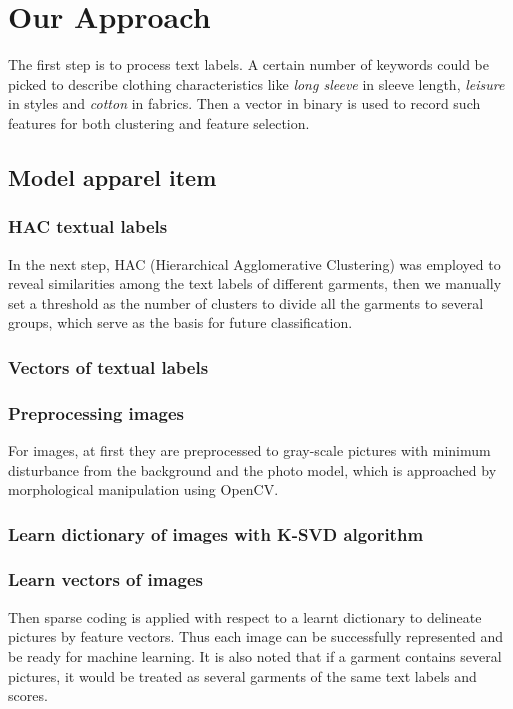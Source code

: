 \section{Our Approach}\label{sec:approach}

The first step is to process text labels. A certain number of keywords 
  could be picked to describe clothing characteristics like 
  \emph{long sleeve} in sleeve length, 
  \emph{leisure} in styles and 
  \emph{cotton} in fabrics. 
Then a vector in binary is used to record such features for both clustering and feature selection.


\subsection{Model apparel item}


\subsubsection{HAC textual labels}
In the next step, HAC (Hierarchical Agglomerative Clustering) was 
employed to reveal similarities among the text labels of different 
garments, then we manually set a threshold as the number of clusters to divide all the garments to several groups, which serve as the basis for future classification.

\subsubsection{Vectors of textual labels}

\subsubsection{Preprocessing images}
For images, at first they are preprocessed to gray-scale pictures with minimum disturbance from the background and the photo model, which is approached by morphological manipulation using OpenCV. 

\subsubsection{Learn dictionary of images with K-SVD algorithm}

\subsubsection{Learn vectors of images}
Then sparse coding is applied with respect to a learnt dictionary  
  to delineate pictures by feature vectors. 
Thus each image can be successfully represented and be ready for machine learning. 
It is also noted that if a garment contains several pictures, 
  it would be treated as several garments of the same text labels and scores.
  
